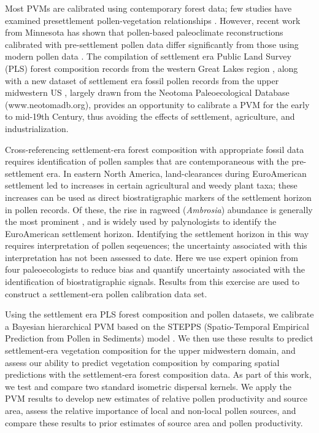 \documentclass[12pt]{article}
\begin{document}
Most PVMs are calibrated using contemporary forest data; few studies
have examined presettlement pollen-vegetation relationships
\citep{schwartz1989predicting}.  However, recent work from Minnesota
has shown that pollen-based paleoclimate reconstructions calibrated
with pre-settlement pollen data differ significantly from those using
modern pollen data \citep{st2014bias}. The compilation of settlement
era Public Land Survey (PLS) forest composition records from the
western Great Lakes region \citep{goring_witness, bourdo1956review,
  schulte2001original, almendinger1996minnesota}, along with a new
dataset of settlement era fossil pollen records from the upper
midwestern US \citep{kujawa2015}, largely drawn from the Neotoma
Paleoecological Database (www.neotomadb.org), provides an opportunity
to calibrate a PVM for the early to mid-19th Century, thus avoiding
the effects of settlement, agriculture, and industrialization.

Cross-referencing settlement-era forest composition with appropriate
fossil data requires identification of pollen samples that are
contemporaneous with the pre-settlement era.  In eastern North
America, land-clearances during EuroAmerican settlement led to
increases in certain agricultural and weedy plant taxa; these
increases can be used as direct biostratigraphic markers of the
settlement horizon in pollen records. Of these, the rise in ragweed
(\textit{Ambrosia}) abundance is generally the most prominent
\citep{mcandrews1988human}, and is widely used by palynologists to
identify the EuroAmerican settlement horizon. Identifying the
settlement horizon in this way requires interpretation of pollen
seqeuences; the uncertainty associated with this interpretation has
not been assessed to date. Here we use expert opinion from four
paleoecologists to reduce bias and quantify uncertainty associated
with the identification of biostratigraphic signals. Results from this
exercise are used to construct a settlement-era pollen calibration
data set.

Using the settlement era PLS forest composition and pollen datasets,
we calibrate a Bayesian hierarchical PVM based on the STEPPS
(Spatio-Temporal Empirical Prediction from Pollen in Sediments) model
\citep{paciorek2009mapping}. We then use these results to predict
settlement-era vegetation composition for the upper midwestern domain,
and assess our ability to predict vegetation composition by comparing
spatial predictions with the settlement-era forest composition
data. As part of this work, we test and compare two standard isometric
dispersal kernels. We apply the PVM results to develop new estimates
of relative pollen productivity and source area, assess the relative
importance of local and non-local pollen sources, and compare these
results to prior estimates of source area and pollen productivity.
\end{document}
